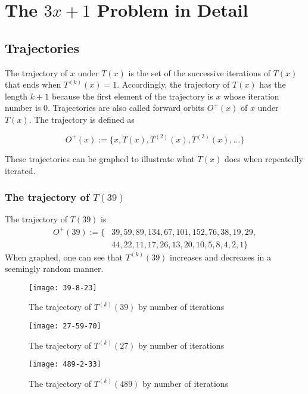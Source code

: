 \documentclass[12pt,a4paper,reqno]{amsart}
\begin{document}
\section{The $3x+1$ Problem in Detail}

\subsection{Trajectories}

The trajectory of $x$ under $T(x)$ is the set of the successive iterations of 
$T(x)$ that ends when $T^{(k)}(x)=1$. Accordingly, the trajectory of $T(x)$ has
the length $k+1$ because the first element of the trajectory is $x$ whose
iteration number is 0. Trajectories are also called forward orbits 
$O^+(x)$ of $x$ under $T(x)$. The trajectory is defined as 

\begin{equation}
    \nonumber
    O^+(x):=\{x, T(x), T^{(2)}(x), T^{(3)}(x),\dots\}
\end{equation}

These trajectories can be graphed to illustrate what $T(x)$ does when
repeatedly iterated. 

\subsubsection{The trajectory of $T(39)$}

The trajectory of $T(39)$ is
\begin{align}
    \nonumber
    O^+(39):=\{&39,59,89,134,67,101,152,76,38,19,29,\\
    \nonumber
               &44,22,11,17,26,13,20,10,5,8,4,2,1\}
\end{align}
When graphed, one can see that $T^{(k)}(39)$ increases and decreases in
a seemingly random manner.
\begin{figure}[h]
\texttt{[image: 39-8-23]}
    \caption{The trajectory of $T^{(k)}(39)$ by number of iterations}
\label{fig:01}
\end{figure}
\begin{figure}[h]
\texttt{[image: 27-59-70]}
    \caption{The trajectory of $T^{(k)}(27)$ by number of iterations}
\label{fig:02}
\end{figure}
\begin{figure}[h]
\texttt{[image: 489-2-33]}
    \caption{The trajectory of $T^{(k)}(489)$ by number of iterations}
\label{fig:03}
\end{figure}
\end{document}
